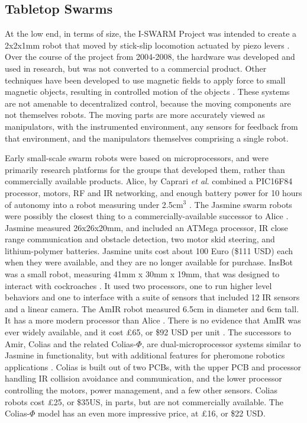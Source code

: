 \subsection{Tabletop Swarms} \label{section:Tabletop_Swarms}

At the low end, in terms of size, the I-SWARM Project was intended to create a 2x2x1mm robot that moved by stick-slip locomotion actuated by piezo levers \citep{seyfried2005swarm}. 
Over the course of the project from 2004-2008, the hardware was developed and used in research, but was not converted to a commercial product.
Other techniques have been developed to use magnetic fields to apply force to small magnetic objects, resulting in controlled motion of the objects \citep{floyd2008untethered, pelrine2012diamagnetically}.
These systems are not amenable to decentralized control, because the moving components are not themselves robots. 
The moving parts are more accurately viewed as manipulators, with the instrumented environment, any sensors for feedback from that environment, and the manipulators themselves comprising a single robot. 

Early small-scale swarm robots were based on microprocessors, and were primarily research platforms for the groups that developed them, rather than commercially available products.
Alice, by Caprari \emph{et al}. combined a PIC16F84 processor, motors, RF and IR networking, and enough battery power for 10 hours of autonomy into a robot measuring under 2.5cm$^3$ \citep{caprari1998autonomous}. 
The Jasmine swarm robots were possibly the closest thing to a commercially-available successor to Alice \citep{kernbach2011swarmrobot}.
Jasmine measured 26x26x20mm, and included an ATMega processor, IR close range communication and obstacle detection, two motor skid steering, and lithium-polymer batteries.
Jasmine units cost about 100 Euro (\$111 USD) each when they were available, and they are no longer available for purchase. 
InsBot was a small robot, measuring 41mm x 30mm x 19mm, that was designed to interact with cockroaches \citep{colot2004insbot}.
It used two processors, one to run higher level behaviors and one to interface with a suite of sensors that included 12 IR sensors and a linear camera. 
The AmIR robot measured 6.5cm in diameter and 6cm tall. It has a more modern processor than Alice \citep{arvin2009development}.
There is no evidence that AmIR was ever widely available, and it cost \pounds65, or \$92 USD per unit \citep{arvin2015colias}.
The successors to Amir, Colias and the related Colias-$\Phi$, are dual-microprocessor systems similar to Jasmine in functionality, but with additional features for pheromone robotics applications \citep{arvin2014colias, arvin2015colias}. 
Colias is built out of two PCBs, with the upper PCB and processor handling IR collision avoidance and communication, and the lower processor controlling the motors, power management, and a few other sensors.
Colias robots cost \pounds25, or \$35US, in parts, but are not commercially available. 
The Colias-$\Phi$ model has an even more impressive price, at \pounds16, or \$22 USD.

